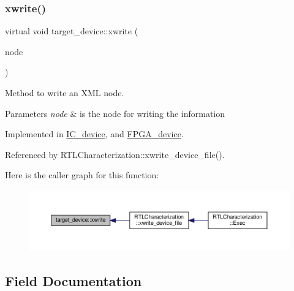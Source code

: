 \subsubsection{\texorpdfstring{xwrite()}{xwrite()}}
{\footnotesize\ttfamily virtual void target\+\_\+device\+::xwrite (\begin{DoxyParamCaption}\item[{\hyperlink{classxml__element}{xml\+\_\+element} $\ast$}]{node }\end{DoxyParamCaption})\hspace{0.3cm}{\ttfamily [pure virtual]}}



Method to write an X\+ML node. 


\begin{DoxyParams}{Parameters}
{\em node} & is the node for writing the information \\
\hline
\end{DoxyParams}


Implemented in \hyperlink{classIC__device_a9f1d0aed8216506d868bcab429fe9536}{I\+C\+\_\+device}, and \hyperlink{classFPGA__device_afc6da3ca7ff26af47400272956f6c397}{F\+P\+G\+A\+\_\+device}.



Referenced by R\+T\+L\+Characterization\+::xwrite\+\_\+device\+\_\+file().

Here is the caller graph for this function\+:
\nopagebreak
\begin{figure}[H]
\begin{center}
\leavevmode
\includegraphics[width=350pt]{d9/dd8/classtarget__device_adddcd8f3eed98d93007b4ebc68be2f82_icgraph}
\end{center}
\end{figure}


\subsection{Field Documentation}
\mbox{\label{classtarget__device_abdff345a8f1e00792ddc58a3a732dde4}} 
